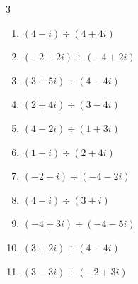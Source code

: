 \begin{multicols}{3}
\begin{enumerate}

  \item $\displaystyle (4-i)\div(4+4i)$


  \item $\displaystyle (-2+2i)\div(-4+2i)$


  \item $\displaystyle (3+5i)\div(4-4i)$


\columnbreak %

  \item $\displaystyle (2+4i)\div(3-4i)$


  \item $\displaystyle (4-2i)\div(1+3i)$


  \item $\displaystyle (1+i)\div(2+4i)$


  \item $\displaystyle (-2-i)\div(-4-2i)$


  \item $\displaystyle (4-i)\div(3+i)$


  \item $\displaystyle (-4+3i)\div(-4-5i)$


  \item $\displaystyle (3+2i)\div(4-4i)$


  \item $\displaystyle (3-3i)\div(-2+3i)$



\end{enumerate}
\end{multicols}
